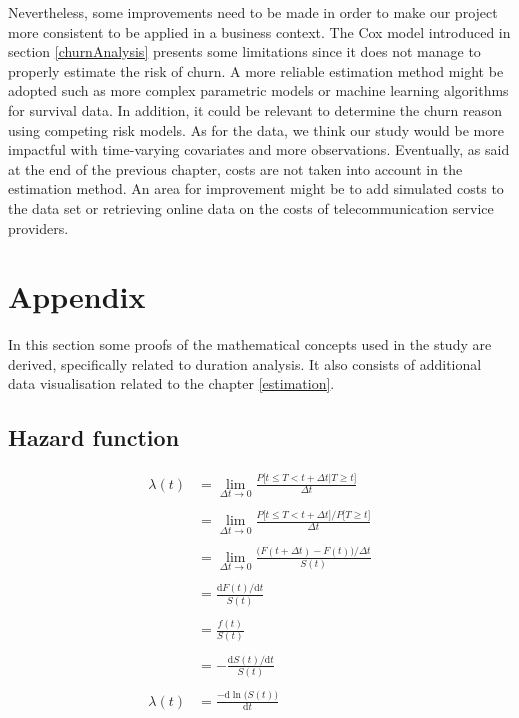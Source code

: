 \documentclass[
]{book}
\begin{document}
Nevertheless, some improvements need to be made in order to make our project more consistent to be applied in a business context. The Cox model introduced in section \ref{churnAnalysis} presents some limitations since it does not manage to properly estimate the risk of churn. A more reliable estimation method might be adopted such as more complex parametric models or machine learning algorithms for survival data. In addition, it could be relevant to determine the churn reason using competing risk models. As for the data, we think our study would be more impactful with time-varying covariates and more observations. Eventually, as said at the end of the previous chapter, costs are not taken into account in the estimation method. An area for improvement might be to add simulated costs to the data set or retrieving online data on the costs of telecommunication service providers.

\hypertarget{appendix}{%
\chapter*{Appendix}\label{appendix}}

In this section some proofs of the mathematical concepts used in the study are derived, specifically related to duration analysis. It also consists of additional data visualisation related to the chapter \ref{estimation}.

\hypertarget{hazard-function}{%
\section*{Hazard function}\label{hazard-function}}

\begin{equation}    
  \begin{aligned}
  \lambda(t) & = \lim_{\Delta t \to 0} \frac{P\big[t \leq T < t + \Delta t | T \geq t \big]}{\Delta t} \\\\
  & = \lim_{\Delta t \to 0} \frac{P\big[t \leq T < t + \Delta t \big] / P\big[T \geq t  \big]}{\Delta t} \\\\
  & = \lim_{\Delta t \to 0} \frac{\big(F(t+\Delta t)-F(t)\big) / \Delta t}{S(t)} \\\\
  & = \frac{\text{d} F(t) / \text{d} t}{S(t)} \\\\
  & = \frac{f(t)}{S(t)} \\\\
  & = - \frac{\text{d}S(t) / \text{d} t}{S(t)} \\\\
  \lambda(t) & = \frac{-\text{d} \ln \big(S(t)\big)}{\text{d} t}
  \end{aligned}
  \label{eq:hazfunproof}
\end{equation}
\end{document}
